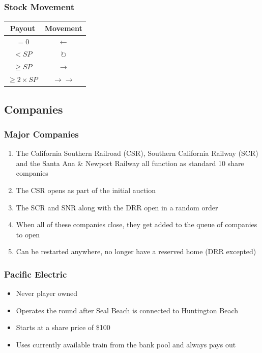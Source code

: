\documentclass[letterpaper]{article}
\begin{document}
\begin{multicols}{2}
    \subsubsection*{Stock Movement}
    \begin{tabular}{c|c}
      \hline
      \textbf{Payout} & \textbf{Movement} \\
      \hline
      \hline
      $= 0$ & $\leftarrow$ \\
      $< SP$ & $\circlearrowright$ \\
      $\geq SP$ & $\rightarrow$ \\
      $\geq 2 \times SP$ & $\rightarrow\rightarrow$ \\
      \hline
    \end{tabular}

    \subsection*{Companies}

    \subsubsection*{Major Companies}
    \begin{enumerate}
    \item The California Southern Railroad (CSR), Southern California Railway (SCR)
    and the Santa Ana \& Newport Railway all function as standard 10 share
    companies
    \item The CSR opens as part of the initial auction
    \item The SCR and SNR along with the DRR open in a random order
    \item When all of these companies close, they get added to the queue of companies to open
    \item Can be restarted anywhere, no longer have a reserved home (DRR excepted)
    \end{enumerate}

    \subsubsection*{Pacific Electric}
    \begin{itemize}
    \item Never player owned
    \item Operates the round after Seal Beach is connected to Huntington Beach
    \item Starts at a share price of \$100
    \item Uses currently available train from the bank pool and always pays out
    \end{itemize}

\end{multicols}
\end{document}
